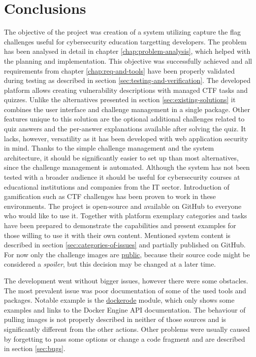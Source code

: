 \chapter{Conclusions}

The objective of the project was creation of a system utilizing capture the flag challenges useful for cybersecurity education targetting developers. The problem has been analysed in detail in chapter \ref{chap:problem-analysis}, which helped with the planning and implementation. This objective was successfully achieved and all requirements from chapter \ref{chap:req-and-tools} have been properly validated during testing as described in section \ref{sec:testing-and-verification}. The developed platform allows creating vulnerability descriptions with managed CTF tasks and quizzes. Unlike the alternatives presented in section \ref{sec:existing-solutions} it combines the user interface and challenge management in a single package. Other features unique to this solution are the optional additional challenges related to quiz answers and the per-answer explanations available after solving the quiz. It lacks, however, versatility as it has been developed with web application security in mind. Thanks to the simple challenge management and the system architecture, it should be significantly easier to set up than most alternatives, since the challenge management is automated.
Although the system has not been tested with a broader audience it should be useful for cybersecurity courses at educational institutions and companies from the IT sector. Introduction of gamification such as CTF challenges has been proven to work in these environments. The project is open-source and available on GitHub to everyone who would like to use it. Together with platform exemplary categories and tasks have been prepared to demonstrate the capabilities and present examples for those willing to use it with their own content. Mentioned system content is described in section \ref{sec:categories-of-issues} and partially published on GitHub. For now only the challenge images are \href{https://github.com/krzysdz?ecosystem=container&tab=packages}{public}, because their source code might be considered a \textit{spoiler}, but this decision may be changed at a later time.

The development went without bigger issues, however there were some obstacles. The most prevalent issue was poor documentation of some of the used tools and packages. Notable example is the \href{https://github.com/apocas/dockerode}{dockerode} module, which only shows some examples and links to the Docker Engine API documentation. The behaviour of pulling images is not properly described in neither of those sources and is significantly different from the other actions. Other problems were usually caused by forgetting to pass some options or change a code fragment and are described in section \ref{sec:bugs}.

